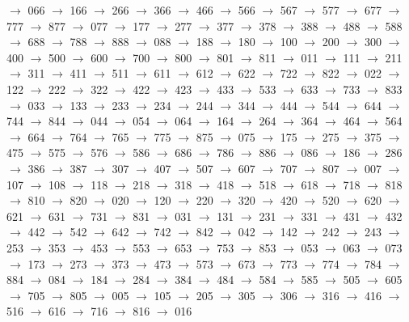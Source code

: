 $\rightarrow$ 066 $\rightarrow$ 166 $\rightarrow$ 266 $\rightarrow$ 366 $\rightarrow$ 466 $\rightarrow$ 566 $\rightarrow$ 567 $\rightarrow$ 577 $\rightarrow$ 677 $\rightarrow$ 777 $\rightarrow$ 877 $\rightarrow$ 077 $\rightarrow$ 177 $\rightarrow$ 277 $\rightarrow$ 377 $\rightarrow$ 378 $\rightarrow$ 388 $\rightarrow$ 488 $\rightarrow$ 588 $\rightarrow$ 688 $\rightarrow$ 788 $\rightarrow$ 888 $\rightarrow$ 088 $\rightarrow$ 188 $\rightarrow$ 180 $\rightarrow$ 100 $\rightarrow$ 200 $\rightarrow$ 300 $\rightarrow$ 400 $\rightarrow$ 500 $\rightarrow$ 600 $\rightarrow$ 700 $\rightarrow$ 800 $\rightarrow$ 801 $\rightarrow$ 811 $\rightarrow$ 011 $\rightarrow$ 111 $\rightarrow$ 211 $\rightarrow$ 311 $\rightarrow$ 411 $\rightarrow$ 511 $\rightarrow$ 611 $\rightarrow$ 612 $\rightarrow$ 622 $\rightarrow$ 722 $\rightarrow$ 822 $\rightarrow$ 022 $\rightarrow$ 122 $\rightarrow$ 222 $\rightarrow$ 322 $\rightarrow$ 422 $\rightarrow$ 423 $\rightarrow$ 433 $\rightarrow$ 533 $\rightarrow$ 633 $\rightarrow$ 733 $\rightarrow$ 833 $\rightarrow$ 033 $\rightarrow$ 133 $\rightarrow$ 233 $\rightarrow$ 234 $\rightarrow$ 244 $\rightarrow$ 344 $\rightarrow$ 444 $\rightarrow$ 544 $\rightarrow$ 644 $\rightarrow$ 744 $\rightarrow$ 844 $\rightarrow$ 044 $\rightarrow$ 054 $\rightarrow$ 064 $\rightarrow$ 164 $\rightarrow$ 264 $\rightarrow$ 364 $\rightarrow$ 464 $\rightarrow$ 564 $\rightarrow$ 664 $\rightarrow$ 764 $\rightarrow$ 765 $\rightarrow$ 775 $\rightarrow$ 875 $\rightarrow$ 075 $\rightarrow$ 175 $\rightarrow$ 275 $\rightarrow$ 375 $\rightarrow$ 475 $\rightarrow$ 575 $\rightarrow$ 576 $\rightarrow$ 586 $\rightarrow$ 686 $\rightarrow$ 786 $\rightarrow$ 886 $\rightarrow$ 086 $\rightarrow$ 186 $\rightarrow$ 286 $\rightarrow$ 386 $\rightarrow$ 387 $\rightarrow$ 307 $\rightarrow$ 407 $\rightarrow$ 507 $\rightarrow$ 607 $\rightarrow$ 707 $\rightarrow$ 807 $\rightarrow$ 007 $\rightarrow$ 107 $\rightarrow$ 108 $\rightarrow$ 118 $\rightarrow$ 218 $\rightarrow$ 318 $\rightarrow$ 418 $\rightarrow$ 518 $\rightarrow$ 618 $\rightarrow$ 718 $\rightarrow$ 818 $\rightarrow$ 810 $\rightarrow$ 820 $\rightarrow$ 020 $\rightarrow$ 120 $\rightarrow$ 220 $\rightarrow$ 320 $\rightarrow$ 420 $\rightarrow$ 520 $\rightarrow$ 620 $\rightarrow$ 621 $\rightarrow$ 631 $\rightarrow$ 731 $\rightarrow$ 831 $\rightarrow$ 031 $\rightarrow$ 131 $\rightarrow$ 231 $\rightarrow$ 331 $\rightarrow$ 431 $\rightarrow$ 432 $\rightarrow$ 442 $\rightarrow$ 542 $\rightarrow$ 642 $\rightarrow$ 742 $\rightarrow$ 842 $\rightarrow$ 042 $\rightarrow$ 142 $\rightarrow$ 242 $\rightarrow$ 243 $\rightarrow$ 253 $\rightarrow$ 353 $\rightarrow$ 453 $\rightarrow$ 553 $\rightarrow$ 653 $\rightarrow$ 753 $\rightarrow$ 853 $\rightarrow$ 053 $\rightarrow$ 063 $\rightarrow$ 073 $\rightarrow$ 173 $\rightarrow$ 273 $\rightarrow$ 373 $\rightarrow$ 473 $\rightarrow$ 573 $\rightarrow$ 673 $\rightarrow$ 773 $\rightarrow$ 774 $\rightarrow$ 784 $\rightarrow$ 884 $\rightarrow$ 084 $\rightarrow$ 184 $\rightarrow$ 284 $\rightarrow$ 384 $\rightarrow$ 484 $\rightarrow$ 584 $\rightarrow$ 585 $\rightarrow$ 505 $\rightarrow$ 605 $\rightarrow$ 705 $\rightarrow$ 805 $\rightarrow$ 005 $\rightarrow$ 105 $\rightarrow$ 205 $\rightarrow$ 305 $\rightarrow$ 306 $\rightarrow$ 316 $\rightarrow$ 416 $\rightarrow$ 516 $\rightarrow$ 616 $\rightarrow$ 716 $\rightarrow$ 816 $\rightarrow$ 016 